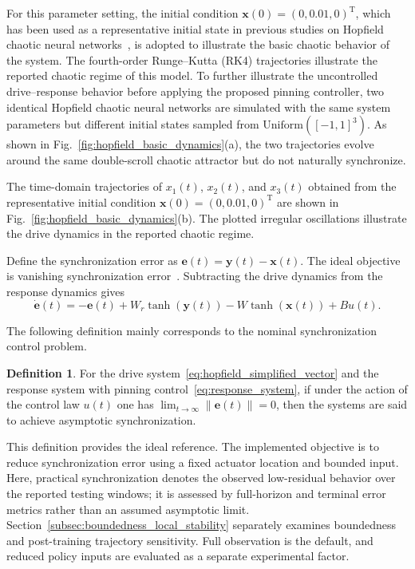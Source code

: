 \documentclass[a4paper,fleqn]{cas-dc}
\theoremstyle{plain}
\theoremstyle{definition}
\newtheorem{definition}{Definition}
\begin{document}
For this parameter setting, the initial condition 
$\mathbf{x}(0)=(0,0.01,0)^{\mathrm T}$, which has been used as a representative initial state in previous studies on Hopfield chaotic neural networks~\cite{mahmoud2021analysis}, is adopted to illustrate the basic chaotic behavior of the system. The fourth-order Runge--Kutta (RK4) trajectories illustrate the reported chaotic regime of this model. To further illustrate the uncontrolled drive--response behavior before applying the proposed pinning controller, two identical Hopfield chaotic neural networks are simulated with the same system parameters but different initial states sampled from $\mathrm{Uniform} ([-1,1]^3)$. As shown in Fig.~\ref{fig:hopfield_basic_dynamics}(a), the two trajectories evolve around the same double-scroll chaotic attractor but do not naturally synchronize.

The time-domain trajectories of $x_1(t)$, $x_2(t)$, and $x_3(t)$ obtained from the representative initial condition $\mathbf{x}(0)=(0,0.01,0)^{\mathrm T}$ are shown in Fig.~\ref{fig:hopfield_basic_dynamics}(b). The plotted irregular oscillations illustrate the drive dynamics in the reported chaotic regime.

Define the synchronization error as $\mathbf{e}(t) = \mathbf{y}(t) - \mathbf{x}(t)$. The ideal objective is vanishing synchronization error~\cite{boccaletti2002synchronization}. Subtracting the drive dynamics from the response dynamics gives
\begin{equation}
	\dot{\mathbf{e}}(t) = -\mathbf{e}(t) + W_r \tanh(\mathbf{y}(t)) - W \tanh(\mathbf{x}(t)) + B u(t).
	\label{eq:error_system_exact}
\end{equation}

The following definition mainly corresponds to the nominal synchronization control problem.
\begin{definition}
	For the drive system~\eqref{eq:hopfield_simplified_vector} and the response system with pinning control~\eqref{eq:response_system}, if under the action of the control law $u(t)$ one has $\lim_{t \to \infty} \| \mathbf{e}(t) \| = 0$, then the systems are said to achieve asymptotic synchronization.
\end{definition}

This definition provides the ideal reference. The implemented objective is to reduce synchronization error using a fixed actuator location and bounded input. Here, practical synchronization denotes the observed low-residual behavior over the reported testing windows; it is assessed by full-horizon and terminal error metrics rather than an assumed asymptotic limit. Section~\ref{subsec:boundedness_local_stability} separately examines boundedness and post-training trajectory sensitivity. Full observation is the default, and reduced policy inputs are evaluated as a separate experimental factor.
\end{document}
